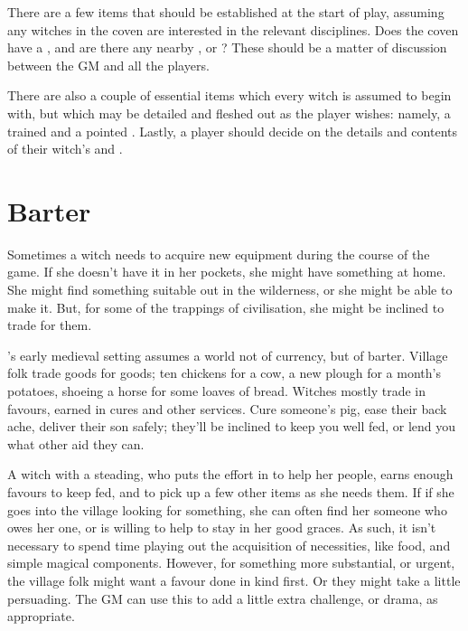 There are a few items that should be established at the start of play, assuming any witches in the coven are interested in the relevant disciplines.
Does the coven have a , and are there any nearby , or ?
These should be a matter of discussion between the GM and all the players.

There are also a couple of essential items which every witch is assumed to begin with, but which may be detailed and fleshed out as the player wishes: namely, a trained  and a pointed {\hat}.
Lastly, a player should decide on the details and contents of their witch's  and .



\section{Barter}

Sometimes a witch needs to acquire new equipment during the course of the game.
If she doesn't have it in her pockets, she might have something at home.
She might find something suitable out in the wilderness, or she might be able to make it.
But, for some of the trappings of civilisation, she might be inclined to trade for them.

's early medieval setting assumes a world not of currency, but of barter.
Village folk trade goods for goods; ten chickens for a cow, a new plough for a month's potatoes, shoeing a horse for some loaves of bread.
Witches mostly trade in favours, earned in cures and other services.
Cure someone's pig, ease their back ache, deliver their son safely; they'll be inclined to keep you well fed, or lend you what other aid they can.

A witch with a steading, who puts the effort in to help her people, earns enough favours to keep fed, and to pick up a few other items as she needs them.
If if she goes into the village looking for something, she can often find her someone who owes her one, or is willing to help to stay in her good graces.
As such, it isn't necessary to spend time playing out the acquisition of necessities, like food, and simple magical components.
However, for something more substantial, or urgent, the village folk might want a favour done in kind first.
Or they might take a little persuading.
The GM can use this to add a little extra challenge, or drama, as appropriate.



